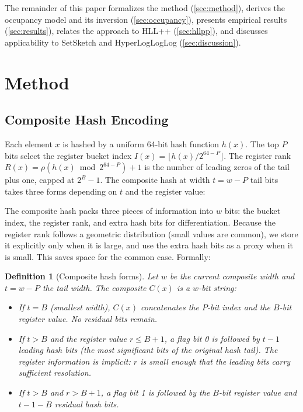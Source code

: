 \documentclass[11pt,letterpaper]{article}
\newtheorem{definition}[theorem]{Definition}
\begin{document}
The remainder of this paper formalizes the method (\autoref{sec:method}),
derives the occupancy model and its inversion (\autoref{sec:occupancy}),
presents empirical results (\autoref{sec:results}), relates the
approach to HLL++ (\autoref{sec:hllpp}), and discusses
applicability to SetSketch and HyperLogLogLog
(\autoref{sec:discussion}).

\section{Method}
\label{sec:method}

\subsection{Composite Hash Encoding}

Each element $x$ is hashed by a uniform 64-bit hash function $h(x)$.
The top $P$ bits select the register bucket index
$I(x) = \lfloor h(x) / 2^{64-P} \rfloor$. The register rank
$R(x) = \rho(h(x) \bmod 2^{64-P}) + 1$ is the number of leading zeros
of the tail plus one, capped at $2^B - 1$. The composite hash at width
$t = w - P$ tail bits takes three forms depending on $t$ and the
register value:

The composite hash packs three pieces of information into $w$ bits:
the bucket index, the register rank, and extra hash bits for
differentiation. Because the register rank follows a geometric
distribution (small values are common), we store it explicitly only
when it is large, and use the extra hash bits as a proxy when it is
small. This saves space for the common case. Formally:

\begin{definition}[Composite hash forms]
Let $w$ be the current composite width and $t = w - P$ the tail width.
The composite $C(x)$ is a $w$-bit string:
\begin{itemize}
  \item If $t = B$ (smallest width), $C(x)$ concatenates the $P$-bit
    index and the $B$-bit register value. No residual bits remain.
  \item If $t > B$ and the register value $r \leq B + 1$, a flag bit 0
    is followed by $t - 1$ leading hash bits (the most significant
    bits of the original hash tail). The register information is
    implicit: $r$ is small enough that the leading bits carry
    sufficient resolution.
  \item If $t > B$ and $r > B + 1$, a flag bit 1 is followed by the
    $B$-bit register value and $t - 1 - B$ residual hash bits.
\end{itemize}
\end{definition}
\end{document}
